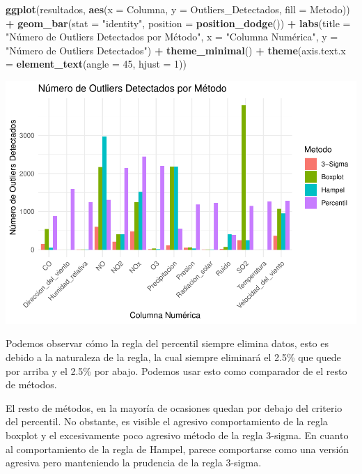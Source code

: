 \documentclass[notspecified,article,submit,moreauthors,pdftex]{Definitions/mdpi}
\newenvironment{Shaded}{\begin{snugshade}}{\end{snugshade}}
\newcommand{\AttributeTok}[1]{\textcolor[rgb]{0.13,0.29,0.53}{#1}}
\newcommand{\DecValTok}[1]{\textcolor[rgb]{0.00,0.00,0.81}{#1}}
\newcommand{\FunctionTok}[1]{\textcolor[rgb]{0.13,0.29,0.53}{\textbf{#1}}}
\newcommand{\NormalTok}[1]{#1}
\newcommand{\SpecialCharTok}[1]{\textcolor[rgb]{0.81,0.36,0.00}{\textbf{#1}}}
\newcommand{\StringTok}[1]{\textcolor[rgb]{0.31,0.60,0.02}{#1}}
\begin{document}
\begin{Shaded}
\begin{Highlighting}[]
\FunctionTok{ggplot}\NormalTok{(resultados,}
       \FunctionTok{aes}\NormalTok{(}\AttributeTok{x =}\NormalTok{ Columna, }\AttributeTok{y =}\NormalTok{ Outliers\_Detectados, }\AttributeTok{fill =}\NormalTok{ Metodo)) }\SpecialCharTok{+}
  \FunctionTok{geom\_bar}\NormalTok{(}\AttributeTok{stat =} \StringTok{"identity"}\NormalTok{, }\AttributeTok{position =} \FunctionTok{position\_dodge}\NormalTok{()) }\SpecialCharTok{+}
  \FunctionTok{labs}\NormalTok{(}\AttributeTok{title =} \StringTok{"Número de Outliers Detectados por Método"}\NormalTok{,}
       \AttributeTok{x =} \StringTok{"Columna Numérica"}\NormalTok{,}
       \AttributeTok{y =} \StringTok{"Número de Outliers Detectados"}\NormalTok{) }\SpecialCharTok{+}
  \FunctionTok{theme\_minimal}\NormalTok{() }\SpecialCharTok{+}
  \FunctionTok{theme}\NormalTok{(}\AttributeTok{axis.text.x =} \FunctionTok{element\_text}\NormalTok{(}\AttributeTok{angle =} \DecValTok{45}\NormalTok{, }\AttributeTok{hjust =} \DecValTok{1}\NormalTok{))}
\end{Highlighting}
\end{Shaded}

\includegraphics{Memoria_files/figure-latex/unnamed-chunk-17-1.pdf}

Podemos observar cómo la regla del percentil siempre elimina datos, esto
es debido a la naturaleza de la regla, la cual siempre eliminará el
2.5\% que quede por arriba y el 2.5\% por abajo. Podemos usar esto como
comparador de el resto de métodos.

El resto de métodos, en la mayoría de ocasiones quedan por debajo del
criterio del percentil. No obstante, es visible el agresivo
comportamiento de la regla boxplot y el excesivamente poco agresivo
método de la regla 3-sigma. En cuanto al comportamiento de la regla de
Hampel, parece comportarse como una versión agresiva pero manteniendo la
prudencia de la regla 3-sigma.
\end{document}
